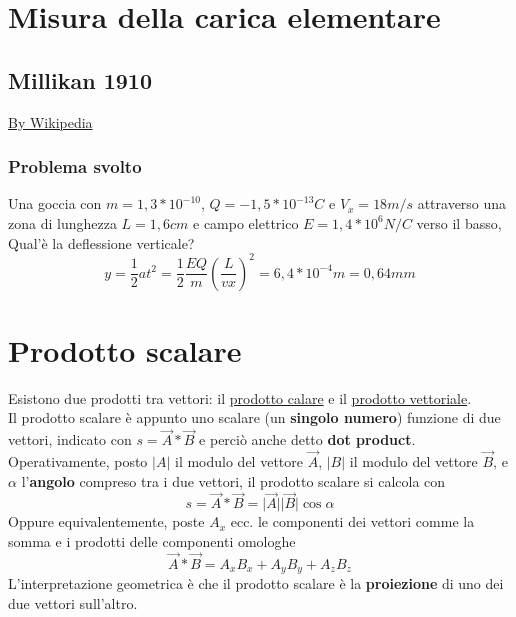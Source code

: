 \documentclass{book}
\newcommand{\abs}[1]{\lvert#1\rvert}
\begin{document}
\section{Misura della carica elementare}
\subsection{Millikan 1910}
\begin{center}
  \href{https://it.wikipedia.org/wiki/Esperimento_di_Millikan}{By Wikipedia}
\end{center}
\subsubsection{Problema svolto}
Una goccia con $m=1,3*10^{-10}$, $Q=-1,5*10^{-13}C$ e $V_x=18m/s$ attraverso una zona di lunghezza $L=1,6cm$ e campo elettrico $E=1,4*10^6N/C$ verso il basso,
Qual'è la deflessione verticale?
\begin{equation}
  y=\frac{1}{2}at^2=\frac{1}{2}\frac{EQ}{m}\left(\frac{L}{vx}\right)^2=6,4*10^{-4}m=0,64mm
\end{equation}
\section{Prodotto scalare}
Esistono due prodotti tra vettori: il \underline{prodotto calare} e il \underline{prodotto vettoriale}.\\
Il prodotto scalare è appunto uno scalare (un \textbf{singolo numero}) funzione di due vettori, indicato con
$s=\vec{A}*\vec{B}$ e perciò anche detto \textbf{dot product}. Operativamente, posto $\abs{A}$ il modulo del vettore $\vec{A}$, $\abs{B}$ il modulo del vettore $\vec{B}$, e $\alpha$ l'\textbf{angolo} compreso tra i due vettori, il prodotto scalare si calcola con
\begin{equation}
	s=\vec{A}*\vec{B}=\abs{\vec{A}}\abs{\vec{B}}\cos \alpha
\end{equation}
Oppure equivalentemente, poste $A_x$ ecc. le componenti dei vettori comme la somma e i prodotti delle componenti
omologhe
\begin{equation}
  \vec{A}*\vec{B}=A_xB_x+A_yB_y+A_zB_z
\end{equation}
L'interpretazione geometrica è che il prodotto scalare è la \textbf{proiezione} di uno dei due vettori
sull'altro.
\end{document}
